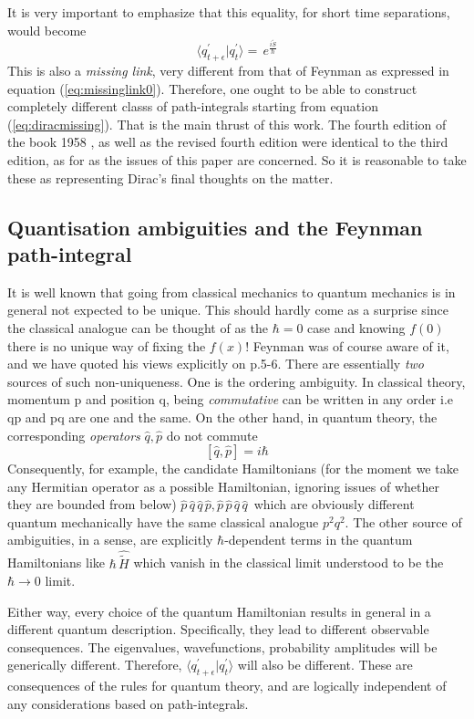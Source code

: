 \documentclass[12pt]{article}
\newcommand{\be}{\begin{equation}}
\newcommand{\ee}{\end{equation}}
\begin{document}
It is very important to emphasize that this equality, for short time separations, would become
\be
\label{eq:diracmissing}
\langle q^\prime_{t+\epsilon}|q^{\prime}_t\rangle 
=\,e^{\frac{i {\tilde S}}{\hbar}}
\ee
This is also a \emph{missing link}, very different from that of Feynman as expressed in equation (\ref{eq:missinglink0}). Therefore, one ought
to be able to construct completely different classs of path-integrals starting from equation (\ref{eq:diracmissing}). That is the main thrust
of this work.
The fourth edition of the
book 1958 \cite{diracbook4}, as well as the revised fourth edition \cite{diracbook4r} were identical to the third edition, as for as the
issues of this paper are concerned. So it is reasonable to take these as representing Dirac's final thoughts on the matter.

\subsection{Quantisation ambiguities and the Feynman path-integral}
It is well known that going from classical mechanics to quantum mechanics is in general not expected to be unique. This should hardly come as a
surprise since the classical analogue can be thought of as the $\hbar = 0$ case and knowing  $f(0)$ there is no unique way of fixing
the $f(x)$! Feynman was of course aware of it, and we have quoted his views explicitly on p.5-6. There are essentially \emph{two} sources
of such non-uniqueness. One 
is the ordering ambiguity. In classical theory, momentum p and position q, being {\it commutative} can be written in any
order i.e qp and pq are one and the same. On the other hand, in quantum theory, the corresponding {\it operators} ${\hat q}, {\hat p}$
do not commute
\be
\label{eq:heisenbergalgebra}
[{\hat q}, {\hat p}] = i\hbar
\ee
Consequently, for example, the candidate Hamiltonians (for the moment we take any Hermitian operator as a possible Hamiltonian, ignoring
issues of whether they are bounded from below) ${\hat p}\,{\hat q}\,{\hat q}\,{\hat p}, {\hat p}\,{\hat p}\,{\hat q}\,{\hat q}\,$ which are 
obviously different quantum mechanically have the same classical analogue $p^2q^2$.  The other source of ambiguities, in a sense, are 
explicitly $\hbar$-dependent terms in the quantum Hamiltonians like $\hbar\,{\hat{\tilde H}}$
which vanish in the classical limit understood to be the $\hbar \rightarrow 0$ limit. 

Either way, every choice of the quantum Hamiltonian results in general in a different
quantum description. Specifically, they lead to different observable consequences. The eigenvalues, wavefunctions, probability amplitudes
will be generically different. Therefore, $\langle q_{t+\epsilon}^\prime|q_t^\prime\rangle$ will also be different. These are consequences
of the rules for quantum theory, and are logically independent of any considerations based on path-integrals. 
\end{document}
